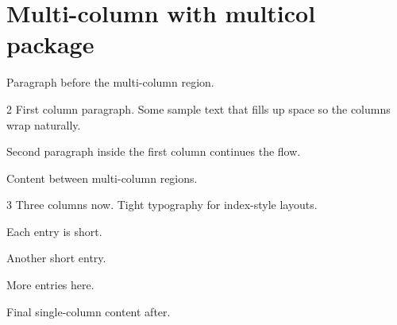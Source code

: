 \documentclass{article}
\begin{document}
\section{Multi-column with multicol package}

Paragraph before the multi-column region.

\begin{multicols}{2}
First column paragraph. Some sample text that fills up space so the columns wrap naturally.

Second paragraph inside the first column continues the flow.
\end{multicols}

Content between multi-column regions.

\begin{multicols}{3}
Three columns now. Tight typography for index-style layouts.

Each entry is short.

Another short entry.

More entries here.
\end{multicols}

Final single-column content after.
\end{document}
